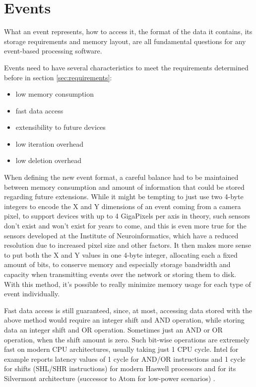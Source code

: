 \documentclass[a4paper,12pt]{report}
\begin{document}
\section{Events} \label{sec:events}

What an event represents, how to access it, the format of the data it contains, its storage requirements and memory layout, are all fundamental questions for any event-based processing software.

Events need to have several characteristics to meet the requirements determined before in section \ref{sec:requirements}:
\begin{itemize}
\item low memory consumption
\item fast data access
\item extensibility to future devices
\item low iteration overhead
\item low deletion overhead
\end{itemize}

When defining the new event format, a careful balance had to be maintained between memory consumption and amount of information that could be stored regarding future extensions. While it might be tempting to just use two 4-byte integers to encode the X and Y dimensions of an event coming from a camera pixel, to support devices with up to 4 GigaPixels per axis in theory, such sensors don't exist and won't exist for years to come, and this is even more true for the sensors developed at the Institute of Neuroinformatics, which have a reduced resolution due to increased pixel size and other factors. It then makes more sense to put both the X and Y values in one 4-byte integer, allocating each a fixed amount of bits, to conserve memory and especially storage bandwidth and capacity when transmitting events over the network or storing them to disk. With this method, it's possible to really minimize memory usage for each type of event individually.

Fast data access is still guaranteed, since, at most, accessing data stored with the above method would require an integer shift and AND operation, while storing data an integer shift and OR operation. Sometimes just an AND or OR operation, when the shift amount is zero. Such bit-wise operations are extremely fast on modern CPU architectures, usually taking just 1 CPU cycle. Intel for example reports latency values of 1 cycle for AND/OR instructions and 1 cycle for shifts (SHL/SHR instructions) for modern Haswell processors and for its Silvermont architecture (successor to Atom for low-power scenarios) \cite{intel_manual}.
\end{document}
